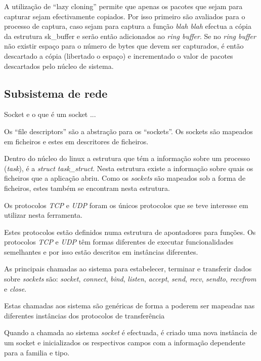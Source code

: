 A utilização de ``lazy cloning'' permite que apenas os pacotes que sejam para
capturar sejam efectivamente copiados. Por isso primeiro são avaliados para o
processo de captura, caso sejam para captura a função \textit{blah blah}
efectua a cópia da estrutura sk\_buffer e serão então adicionados ao
\textit{ring buffer}. Se no \textit{ring buffer} não existir espaço para o
número de bytes que devem ser capturados, é então descartado a cópia
(libertado o espaço) e incrementado o valor de pacotes descartados pelo núcleo
de sistema.


\subsection{Subsistema de rede} %
\label{subsection:network}
Socket  e o que é um socket ...

Os ``file descriptors'' são a abstração para os ``sockets''. Os sockets são
mapeados em ficheiros e estes em descritores de ficheiros. 

Dentro do núcleo do linux a estrutura que tém a informação sobre um processo
(\textit{task}), é a \textit{struct task\_struct}. Nesta estrutura existe a
informação sobre quais os ficheiros que a aplicação abriu. Como os
\textit{sockets} são mapeados sob a forma de ficheiros, estes também se
encontram nesta estrutura.

Os protocolos \textit{TCP} e \textit{UDP} foram os únicos protocolos que se teve
interesse em utilizar nesta ferramenta.

Estes protocolos estão definidos numa estrutura de apontadores para funções.
Os protocolos \textit{TCP} e \textit{UDP} têm formas diferentes de executar
funcionalidades semelhantes e por isso estão descritos em instâncias diferentes.

As principais chamadas ao sistema para estabelecer, terminar e transferir dados
sobre \textit{sockets} são: \textit{socket}, \textit{connect}, \textit{bind},
\textit{listen}, \textit{accept}, \textit{send}, \textit{recv}, \textit{sendto},
\textit{recvfrom} e \textit{close}. 

Estas chamadas aos sistema são genéricas de forma a poderem ser mapeadas nas
diferentes instâncias dos protocolos de transferência

Quando a chamada ao sistema \textit{socket} é efectuada, é criado uma nova
instância de um socket e inicializados os respectivos campos com a informação
dependente para a familia e tipo. 


